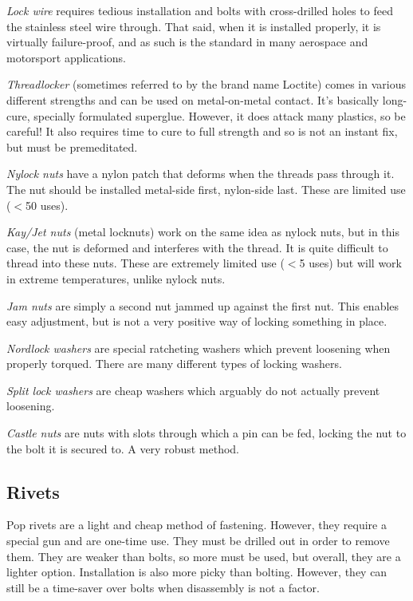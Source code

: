	\begin{asparaenum}[a)]
		\item \textit{Lock wire} requires tedious installation and bolts with cross-drilled holes to feed the stainless steel wire through. That said, when it is installed properly, it is virtually failure-proof, and as such is the standard in many aerospace and motorsport applications. 
		\item \textit{Threadlocker} (sometimes referred to by the brand name Loctite) comes in various different strengths and can be used on metal-on-metal contact. It's basically long-cure, specially formulated superglue. However, it does attack many plastics, so be careful! It also requires time to cure to full strength and so is not an instant fix, but must be premeditated.
		\item \textit{Nylock nuts} have a nylon patch that deforms when the threads pass through it. The nut should be installed metal-side first, nylon-side last. These are limited use ($<$50 uses).
		\item \textit{Kay/Jet nuts} (metal locknuts) work on the same idea as nylock nuts, but in this case, the nut is deformed and interferes with the thread. It is quite difficult to thread into these nuts. These are extremely limited use ($<$5 uses) but will work in extreme temperatures, unlike nylock nuts.
		\item \textit{Jam nuts} are simply a second nut jammed up against the first nut. This enables easy adjustment, but is not a very positive way of locking something in place.
		\item \textit{Nordlock washers} are special ratcheting washers which prevent loosening when properly torqued. There are many different types of locking washers.
		\item \textit{Split lock washers} are cheap washers which arguably do not actually prevent loosening.
		\item \textit{Castle nuts} are nuts with slots through which a pin can be fed, locking the nut to the bolt it is secured to. A very robust method.
	\end{asparaenum}
	
	\subsection{Rivets}
	Pop rivets are a light and cheap method of fastening. However, they require a special gun and are one-time use. They must be drilled out in order to remove them. They are weaker than bolts, so more must be used, but overall, they are a lighter option. Installation is also more picky than bolting. However, they can still be a time-saver over bolts when disassembly is not a factor.
	
